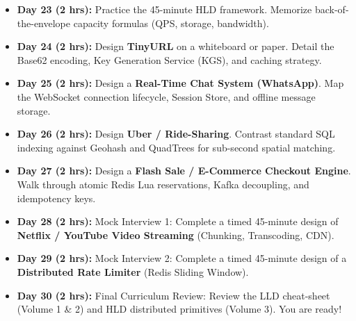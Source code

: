 \documentclass[10pt,journal,compsoc,onecolumn]{IEEEtran}
\begin{document}
\begin{itemize}
    \item \textbf{Day 23 (2 hrs):} Practice the 45-minute HLD framework. Memorize back-of-the-envelope capacity formulas (QPS, storage, bandwidth).
    \item \textbf{Day 24 (2 hrs):} Design \textbf{TinyURL} on a whiteboard or paper. Detail the Base62 encoding, Key Generation Service (KGS), and caching strategy.
    \item \textbf{Day 25 (2 hrs):} Design a \textbf{Real-Time Chat System (WhatsApp)}. Map the WebSocket connection lifecycle, Session Store, and offline message storage.
    \item \textbf{Day 26 (2 hrs):} Design \textbf{Uber / Ride-Sharing}. Contrast standard SQL indexing against Geohash and QuadTrees for sub-second spatial matching.
    \item \textbf{Day 27 (2 hrs):} Design a \textbf{Flash Sale / E-Commerce Checkout Engine}. Walk through atomic Redis Lua reservations, Kafka decoupling, and idempotency keys.
    \item \textbf{Day 28 (2 hrs):} Mock Interview 1: Complete a timed 45-minute design of \textbf{Netflix / YouTube Video Streaming} (Chunking, Transcoding, CDN).
    \item \textbf{Day 29 (2 hrs):} Mock Interview 2: Complete a timed 45-minute design of a \textbf{Distributed Rate Limiter} (Redis Sliding Window).
    \item \textbf{Day 30 (2 hrs):} Final Curriculum Review: Review the LLD cheat-sheet (Volume 1 \& 2) and HLD distributed primitives (Volume 3). You are ready!
\end{itemize}
\end{document}
